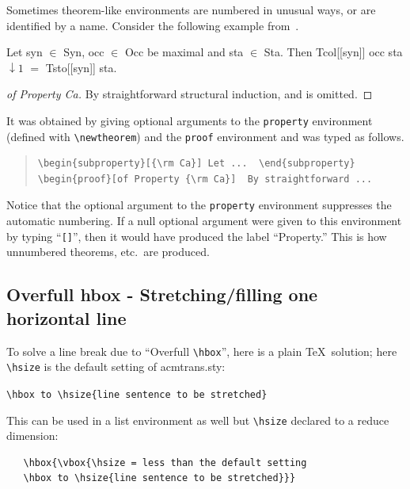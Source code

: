 \documentclass[acmtocl]{acmtrans2m}
\begin{document}
Sometimes theorem-like environments are numbered in unusual ways, or
are identified by a name.  Consider the following example
from~.
\begin{subproperty}[{\rm Ca}]
Let syn $\in$ Syn, occ $\in$ Occ be maximal and sta $\in$ Sta.  Then
Tcol\/{\rm [[}syn\/{\rm ]]} occ sta\hspace{-2pt} $\downarrow\!1$ $=$
Tsto\/{\rm [[}syn\/{\rm ]]} sta.
\end{subproperty}
\begin{proof}[of Property {\rm Ca}]
By straightforward structural induction, and is \linebreak
omitted.
\end{proof}
It was obtained by giving optional arguments to the
{\tt property} environment (defined with \verb|\newtheorem|)
and the {\tt proof} environment and was typed as follows.
\begin{quote}
\begin{verbatim}
\begin{subproperty}[{\rm Ca}] Let ...  \end{subproperty}
\begin{proof}[of Property {\rm Ca}]  By straightforward ...
\end{verbatim}
\end{quote}
Notice that the optional argument to the {\tt property} environment
suppresses the automatic numbering.  If a null optional argument
were given to this environment by typing ``{\tt []}'', then
it would have produced the label ``{\sc Property.}''  This is
how unnumbered theorems, etc.\ are produced.



\subsection{Overfull hbox - Stretching/filling one horizontal line}

To solve a line break due to ``Overfull \verb|\hbox|'', here is a 
plain \TeX\ 
solution; here \verb|\hsize| is the default setting of acmtrans.sty:

\begin{center}
\verb|\hbox to \hsize{line sentence to be stretched}|
\end{center}

This can be used in a list environment as well but \verb|\hsize| 
declared to a reduce
dimension:

\begin{verbatim}
   \hbox{\vbox{\hsize = less than the default setting
   \hbox to \hsize{line sentence to be stretched}}}
\end{verbatim}
\end{document}
